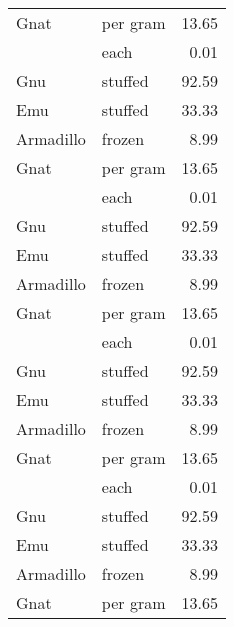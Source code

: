 {
\large
{}

\tablelasttail{}
\begin{center}
\begin{xtabular}{llr}
Gnat      & per gram & 13.65 \\
          & each     & 0.01  \\
Gnu       & stuffed  & 92.59 \\
Emu       & stuffed  & 33.33 \\
Armadillo & frozen   & 8.99  \\
Gnat      & per gram & 13.65 \\
          & each     & 0.01  \\
Gnu       & stuffed  & 92.59 \\
Emu       & stuffed  & 33.33 \\
Armadillo & frozen   & 8.99  \\
Gnat      & per gram & 13.65 \\
          & each     & 0.01  \\
Gnu       & stuffed  & 92.59 \\
Emu       & stuffed  & 33.33 \\
Armadillo & frozen   & 8.99  \\
Gnat      & per gram & 13.65 \\
          & each     & 0.01  \\
Gnu       & stuffed  & 92.59 \\
Emu       & stuffed  & 33.33 \\
Armadillo & frozen   & 8.99  \\
Gnat      & per gram & 13.65 \\

\end{xtabular}
\end{center}}

